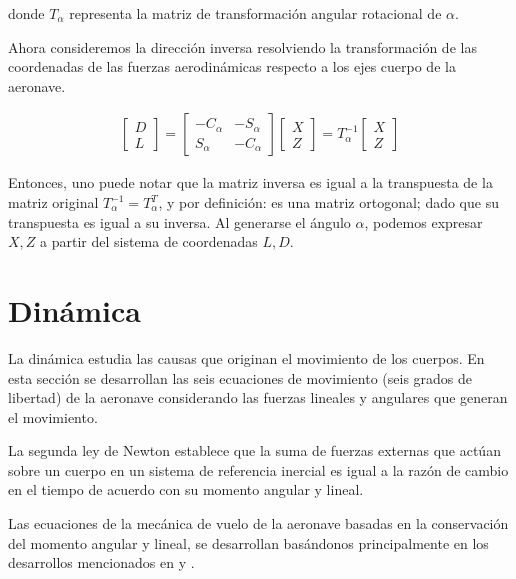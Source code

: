 donde $T_{\alpha}$ representa la matriz de transformación angular rotacional de $\alpha$.

\medskip

Ahora consideremos la dirección inversa resolviendo la transformación de las coordenadas de las fuerzas aerodinámicas respecto a los ejes cuerpo de la aeronave. 


\begin{gather} 
\begin{bmatrix}
D\\
L
\end{bmatrix}
=
\begin{bmatrix}
-C_{\alpha} & -S_{\alpha}\\ 
S_{\alpha} & -C_{\alpha}
\end{bmatrix}
\begin{bmatrix}
X\\
Z
\end{bmatrix}
=
T_{\alpha}^{-1}
\begin{bmatrix}
X \\
Z
\end{bmatrix}
\end{gather}

Entonces, uno puede notar que la matriz inversa es igual a la transpuesta de la matriz original $T_{\alpha}^{-1}=T_{\alpha}^T$, y por definición: es una matriz ortogonal; dado que su transpuesta es igual a su inversa.
%
Al generarse el ángulo $\alpha$, podemos expresar $X,Z$ a partir del sistema de coordenadas  $L,D$. 

\medskip

\section{Dinámica}
La dinámica estudia las causas que originan el movimiento de los cuerpos. En esta sección se desarrollan las seis ecuaciones de movimiento (seis grados de libertad) de la aeronave considerando las fuerzas lineales y angulares que generan el movimiento.

 La segunda ley de Newton establece que la suma de fuerzas externas que actúan sobre un cuerpo en un sistema de referencia inercial es igual a la razón de cambio en el tiempo de acuerdo con su momento angular y lineal. 

 Las ecuaciones de la mecánica de vuelo de la aeronave basadas en la conservación del momento angular y lineal, se desarrollan basándonos principalmente en los desarrollos mencionados en \cite{Schimdt1998} y \cite{USAF1988}.

